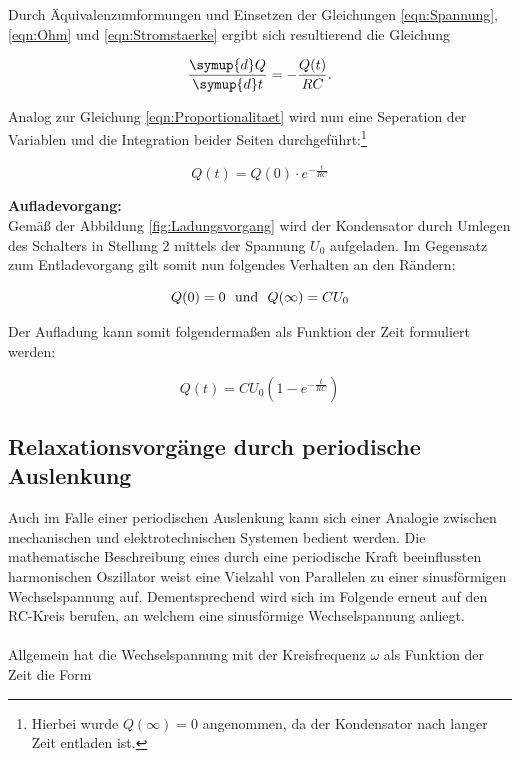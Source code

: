 \noindent Durch Äquivalenzumformungen und Einsetzen der Gleichungen \eqref{eqn:Spannung}, \eqref{eqn:Ohm} und \eqref{eqn:Stromstaerke} ergibt sich 
resultierend die Gleichung

\begin{equation}
    \frac{\symup{d}Q}{\symup{d}t} = -\frac{Q(t)}{RC}.
\end{equation}

\noindent Analog zur Gleichung \eqref{eqn:Proportionalitaet} wird nun eine Seperation der Variablen und die Integration beider
Seiten durchgeführt:\footnote{Hierbei wurde $Q(\infty) = 0$ angenommen, da der Kondensator nach langer Zeit
entladen ist.}

\begin{equation}
\label{eqn:Entladung}
    Q(t) = Q(0) \cdot e^{-\frac{t}{RC}}
\end{equation}

\noindent \textbf{Aufladevorgang:}\\
Gemäß der Abbildung \ref{fig:Ladungsvorgang} wird der Kondensator durch Umlegen des Schalters in Stellung 2 mittels der Spannung
$U_0$ aufgeladen. Im Gegensatz zum Entladevorgang gilt somit nun folgendes Verhalten an den Rändern:

\begin{equation*}
    Q(0) =0 \,\,\,\,\text{und}\,\,\,\, Q(\infty)= CU_0\\
\end{equation*}

\noindent Der Aufladung kann somit folgendermaßen als Funktion der Zeit formuliert werden:

\begin{equation}
    Q(t) = CU_0\left(1 - e^{-\frac{t}{RC}}\right)
\end{equation}

\subsection{Relaxationsvorgänge durch periodische Auslenkung}

Auch im Falle einer periodischen Auslenkung kann sich einer Analogie zwischen mechanischen und elektrotechnischen Systemen
bedient werden. Die mathematische Beschreibung eines durch eine periodische Kraft beeinflussten harmonischen Oszillator weist
eine Vielzahl von Parallelen zu einer sinusförmigen Wechselspannung auf. Dementsprechend wird sich im Folgende erneut auf den
RC-Kreis berufen, an welchem eine sinusförmige Wechselspannung anliegt.\\\\
Allgemein hat die Wechselspannung mit der Kreisfrequenz $\omega$ als Funktion der Zeit die Form

